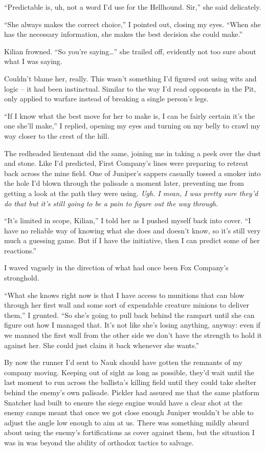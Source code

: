 \documentclass[12pt, openany]{book}
\begin{document}
“Predictable is, uh, not a word I’d use for the Hellhound. Sir,” she said delicately.

“She always makes the correct choice,” I pointed out, closing my eyes. “When she has the necessary information, she makes the best decision she could make.”

Kilian frowned. “So you’re saying…” she trailed off, evidently not too sure about what I was saying.

Couldn’t blame her, really. This wasn’t something I’d figured out using wits and logic – it had been instinctual. Similar to the way I’d read opponents in the Pit, only applied to warfare instead of breaking a single person’s legs.

“If I know what the best move for her to make is, I can be fairly certain it’s the one she’ll make,” I replied, opening my eyes and turning on my belly to crawl my way closer to the crest of the hill.

The redheaded lieutenant did the same, joining me in taking a peek over the dust and stone. Like I’d predicted, First Company’s lines were preparing to retreat back across the mine field. One of Juniper’s sappers casually tossed a smoker into the hole I’d blown through the palisade a moment later, preventing me from getting a look at the path they were using. \textit{Ugh. I mean, I was pretty sure they’d do that but it’s still going to be a pain to figure out the way through.}

“It’s limited in scope, Kilian,” I told her as I pushed myself back into cover. “I have no reliable way of knowing what she does and doesn’t know, so it’s still very much a guessing game. But if I have the initiative, then I can predict some of her reactions.”

I waved vaguely in the direction of what had once been Fox Company’s stronghold.

“What she knows right now is that I have access to munitions that can blow through her first wall and some sort of expendable creature minions to deliver them,” I grunted. “So she’s going to pull back behind the rampart until she can figure out how I managed that. It’s not like she’s losing anything, anyway: even if we manned the first wall from the other side we don’t have the strength to hold it against her. She could just claim it back whenever she wants.”

By now the runner I’d sent to Nauk should have gotten the remnants of my company moving. Keeping out of sight as long as possible, they’d wait until the last moment to run across the ballista’s killing field until they could take shelter behind the enemy’s own palisade. Pickler had assured me that the same platform Snatcher had built to ensure the siege engine would have a clear shot at the enemy camps meant that once we got close enough Juniper wouldn’t be able to adjust the angle low enough to aim at us. There was something mildly absurd about using the enemy’s fortifications as cover against them, but the situation I was in was beyond the ability of orthodox tactics to salvage.
\end{document}
